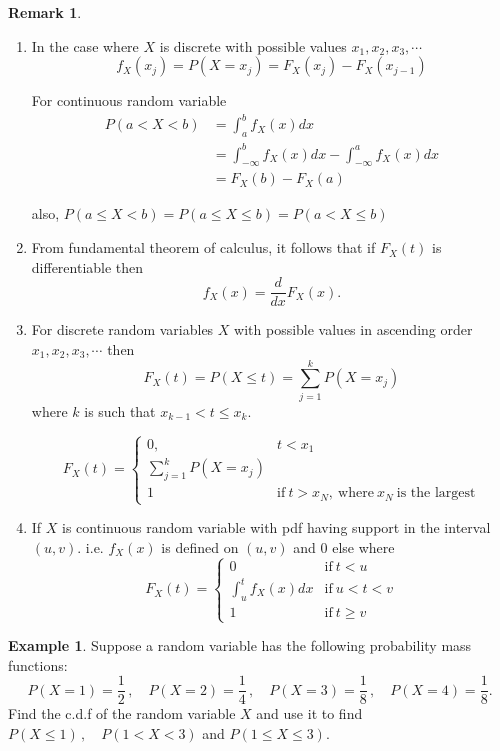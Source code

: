 \documentclass[12pt,a4paper]{report}
\theoremstyle{definition}
\newtheorem{example}[thm]{Example}
\newtheorem{remark}[thm]{Remark}
\theoremstyle{plain}
\theoremstyle{definition}
\begin{document}
\begin{remark}
\textbf{ }
\begin{enumerate}
\item In the case where $X$ is discrete with possible values $x_1,x_2,x_3,\cdots$ \[f_X(x_j)=P(X=x_j)=F_X(x_j)-F_X(x_{j-1})\]

For continuous random variable
\begin{align*}
P(a<X<b)& = \int^b_af_X(x)dx\\
        & = \int^b_{-\infty}f_X(x)dx-\int^a_{-\infty}f_X(x)dx\\
        & = F_X(b)-F_X(a)
\end{align*}

also, $P(a\leq X< b)=P(a\leq X\leq b)=P(a<X\leq b)$
\item From fundamental theorem of calculus, it follows that if $F_X(t)$ is differentiable then \[f_X(x)=\frac{d}{dx}F_X(x).\]
\item For discrete random variables $X$ with possible values in ascending order $x_1,x_2,x_3,\cdots$ then \[F_X(t)=P(X\leq t)=\sum\limits^k_{j=1}P(X=x_j)\]
where $k$ is such that $x_{k-1}<t\leq x_k$.

\[F_X(t)=
\begin{cases}
0, & t<x_1\\
\sum\limits^k_{j=1}P(X=x_j) &\\
1&\text{if}\ t>x_N,\ \text{where}\ x_N\  \text{is the largest}
\end{cases}
\]
\item If $X$ is continuous random variable with pdf having support in the interval $(u,v)$. i.e. $f_X(x)$ is defined on $(u,v)$ and 0 else where
\[ F_X(t)=
\begin{cases}
0 & \text{if}\  t<u\\
\displaystyle{\int^t_uf_X(x)dx} & \text{if}\  u<t<v\\
1 & \text{if}\  t\geq v
\end{cases}
\]
\end{enumerate}
\end{remark}



\begin{example}
Suppose a random variable has the following probability mass functions: \[P(X = 1) = \frac{1}{2}\, , \quad P(X = 2) = \frac{1}{4}\, ,\quad P(X = 3) = \frac{1}{8}\, , \quad P(X = 4) = \frac{1}{8}.\] Find the c.d.f of the random variable $X$ and use it to find $P(X \leq 1)\, , \quad P(1 < X < 3)$ and $P(1\leq X \leq 3)$.
\end{example}
\end{document}
